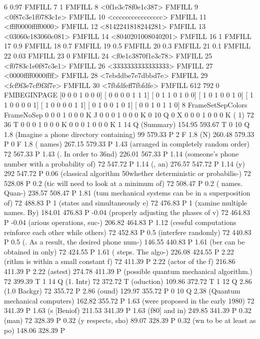 6 0.97 FMFILL
7 1 FMFILL
8 <0f1e3c78f0e1c387> FMFILL
9 <0f87c3e1f0783c1e> FMFILL
10 <cccccccccccccccc> FMFILL
11 <ffff0000ffff0000> FMFILL
12 <8142241818244281> FMFILL
13 <03060c183060c081> FMFILL
14 <8040201008040201> FMFILL
16 1 FMFILL
17 0.9 FMFILL
18 0.7 FMFILL
19 0.5 FMFILL
20 0.3 FMFILL
21 0.1 FMFILL
22 0.03 FMFILL
23 0 FMFILL
24 <f0e1c3870f1e3c78> FMFILL
25 <f0783c1e0f87c3e1> FMFILL
26 <3333333333333333> FMFILL
27 <0000ffff0000ffff> FMFILL
28 <7ebddbe7e7dbbd7e> FMFILL
29 <fcf9f3e7cf9f3f7e> FMFILL
30 <7fbfdfeff7fbfdfe> FMFILL
612 792 0 FMBEGINPAGE
[0 0 0 1 0 0 0]
[ 0 0 0 0 1 1 1]
[ 0 1 1 0 1 0 0]
[ 1 0 1 0 0 1 0]
[ 1 1 0 0 0 0 1]
[ 1 0 0 0 0 1 1]
[ 0 1 0 0 1 0 1]
[ 0 0 1 0 1 1 0]
 8 FrameSetSepColors
FrameNoSep
0 0 0 1 0 0 0 K
J
0 0 0 1 0 0 0 K
0 10 Q
0 X
0 0 0 1 0 0 0 K
(                                                                                        1) 72 36 T
0 0 0 1 0 0 0 K
0 0 0 1 0 0 0 K
1 14 Q
(Summary) 154.95 593.67 T
0 10 Q
1.8 (Imagine a phone directory containing) 99 579.33 P
2 F
1.8 (N) 260.48 579.33 P
0 F
1.8 ( names) 267.15 579.33 P
1.43 (arranged in completely random order) 72 567.33 P
1.43 (. In order to \336nd) 226.01 567.33 P
1.14 (someone's phone number with a probability of) 72 547.72 P
1.14 (, an) 276.57 547.72 P
1.14 (y) 292 547.72 P
0.06 (classical algorithm \050whether deterministic or probabilis-) 72 528.08 P
0.2 (tic will need to look at a minimum of) 72 508.47 P
0.2 ( names. Quan-) 238.57 508.47 P
1.81 (tum mechanical systems can be in a superposition of) 72 488.83 P
1 (states and simultaneously e) 72 476.83 P
1 (xamine multiple names. By) 184.01 476.83 P
-0.04 (properly adjusting the phases of v) 72 464.83 P
-0.04 (arious operations, suc-) 206.82 464.83 P
1.12 (cessful computations reinforce each other while others) 72 452.83 P
0.5 (interfere randomly) 72 440.83 P
0.5 (. As a result, the desired phone num-) 146.55 440.83 P
1.61 (ber can be obtained in only) 72 424.55 P
1.61 ( steps. The algo-) 226.08 424.55 P
2.22 (rithm is within a small constant f) 72 411.39 P
2.22 (actor of the f) 216.86 411.39 P
2.22 (astest) 274.78 411.39 P
(possible quantum mechanical algorithm.) 72 399.39 T
1 14 Q
(1. Intr) 72 372.72 T
(oduction) 109.86 372.72 T
1 12 Q
2.86 (1.0 Backgr) 72 355.72 P
2.86 (ound) 129.97 355.72 P
0 10 Q
2.38 (Quantum mechanical computers) 162.82 355.72 P
1.63 (were proposed in the early 1980) 72 341.39 P
1.63 (s [Beniof) 211.53 341.39 P
1.63 (f80] and in) 249.85 341.39 P
0.32 (man) 72 328.39 P
0.32 (y respects, sho) 89.07 328.39 P
0.32 (wn to be at least as po) 148.06 328.39 P
